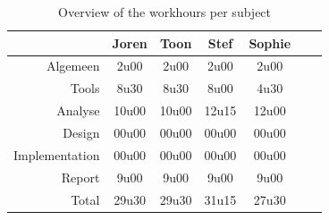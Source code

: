 \documentclass[i2]{oss}
\begin{document}
\begin{table}[h!]
\begin{center}
    \begin{tabular}{ r | c  c  c  c  c  c}
     & Joren & Toon & Stef & Sophie \\ \hline
    Algemeen & 2u00 & 2u00 & 2u00 & 2u00\\
           Tools & 8u30 & 8u30 & 8u00 & 4u30 \\
        Analyse & 10u00 & 10u00 & 12u15 & 12u00 \\
        Design & 00u00 & 00u00 & 00u00 & 00u00 \\
        Implementation & 00u00 & 00u00 & 00u00 & 00u00\\
        Report & 9u00 & 9u00 & 9u00 & 9u00 \\
        Total & 29u30 & 29u30 & 31u15 & 27u30  
    \end{tabular}
    \caption{Overview of the workhours per subject}
    \label{tab:werkuren}
\end{center}
\end{table}
\end{document}
